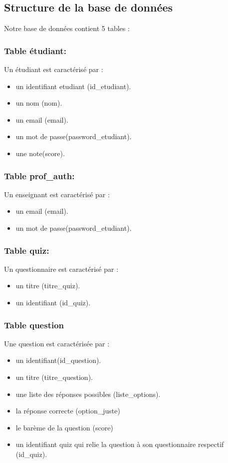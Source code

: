 \documentclass[12pt,a4paper]{article}
\begin{document}
\subsection{Structure de la base de données}
Notre base de données contient 5 tables :

\subsubsection{Table étudiant:} 
Un étudiant est caractérisé par :
\begin{itemize}
\item un identifiant etudiant (id\_etudiant).
\item un nom (nom).
\item un email (email).
\item un mot de passe(password\_etudiant).
\item une note(score).
\end{itemize}

\subsubsection{Table prof\_auth:} 
Un enseignant est caractérisé par :
\begin{itemize}
\item un email (email).
\item un mot de passe(password\_etudiant).
\end{itemize}


\subsubsection{Table quiz:}
Un questionnaire est caractérisé par :
\begin{itemize}
\item un titre (titre\_quiz).
\item un identifiant (id\_quiz).
\end{itemize}


\subsubsection{Table question} 
Une question est caractérisée par :
\begin{itemize}
\item un identifiant(id\_question).
\item un titre (titre\_question).
\item une liste des réponses possibles (liste\_options).
\item la réponse correcte (option\_juste)
\item le barème de la question (score)
\item un identifiant quiz qui relie la question à son questionnaire respectif (id\_quiz).
\end{itemize}
\end{document}
